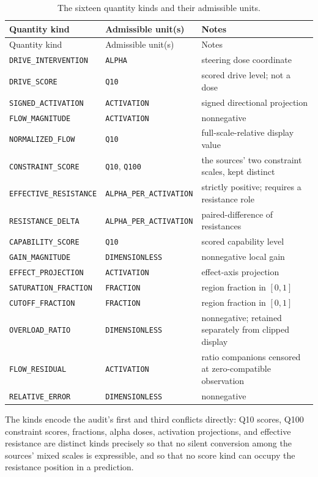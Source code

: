 \begin{longtable}{@{}lll@{}}
\caption{The sixteen quantity kinds and their admissible units.}\label{enums:tab:quantity}\\
\toprule
Quantity kind & Admissible unit(s) & Notes \\
\midrule
\endfirsthead
\toprule
Quantity kind & Admissible unit(s) & Notes \\
\midrule
\endhead
\bottomrule
\endfoot
\texttt{DRIVE\_INTERVENTION} & \texttt{ALPHA} & steering dose coordinate \\
\texttt{DRIVE\_SCORE} & \texttt{Q10} & scored drive level; not a dose \\
\texttt{SIGNED\_ACTIVATION} & \texttt{ACTIVATION} & signed directional projection \\
\texttt{FLOW\_MAGNITUDE} & \texttt{ACTIVATION} & nonnegative \\
\texttt{NORMALIZED\_FLOW} & \texttt{Q10} & full-scale-relative display value \\
\texttt{CONSTRAINT\_SCORE} & \texttt{Q10}, \texttt{Q100} & the sources' two constraint scales, kept distinct \\
\texttt{EFFECTIVE\_RESISTANCE} & \texttt{ALPHA\_PER\_ACTIVATION} & strictly positive; requires a resistance role \\
\texttt{RESISTANCE\_DELTA} & \texttt{ALPHA\_PER\_ACTIVATION} & paired-difference of resistances \\
\texttt{CAPABILITY\_SCORE} & \texttt{Q10} & scored capability level \\
\texttt{GAIN\_MAGNITUDE} & \texttt{DIMENSIONLESS} & nonnegative local gain \\
\texttt{EFFECT\_PROJECTION} & \texttt{ACTIVATION} & effect-axis projection \\
\texttt{SATURATION\_FRACTION} & \texttt{FRACTION} & region fraction in $[0,1]$ \\
\texttt{CUTOFF\_FRACTION} & \texttt{FRACTION} & region fraction in $[0,1]$ \\
\texttt{OVERLOAD\_RATIO} & \texttt{DIMENSIONLESS} & nonnegative; retained separately from clipped display \\
\texttt{FLOW\_RESIDUAL} & \texttt{ACTIVATION} & ratio companions censored at zero-compatible observation \\
\texttt{RELATIVE\_ERROR} & \texttt{DIMENSIONLESS} & nonnegative \\
\end{longtable}

The kinds encode the audit's first and third conflicts directly: Q10 scores, Q100 constraint scores, fractions, alpha doses, activation projections, and effective resistance are distinct kinds precisely so that no silent conversion among the sources' mixed scales is expressible, and so that no score kind can occupy the resistance position in a prediction.

